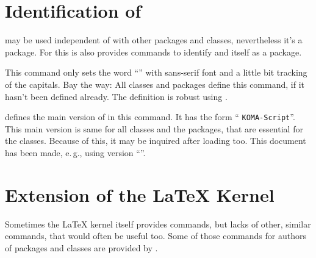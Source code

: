 \section{Identification of \KOMAScript}
\label{sec:scrbase.identify}

 may be used independent of \KOMAScript{} with
other packages and classes, nevertheless it's a \KOMAScript{} package. For
this is also provides commands to identify \KOMAScript{} and itself as a
\KOMAScript{} package.

\begin{Declaration}
\end{Declaration}
%
This command only sets the word ``\KOMAScript'' with sans-serif font and
a little bit tracking of the capitals. Bay the way: All \KOMAScript{} classes
and packages define this command, if it hasn't been defined already. The
definition is robust using .
%


\begin{Declaration}
\end{Declaration}
%
\KOMAScript{} defines the main version of \KOMAScript{} in this command. It
has the form ``  \texttt{KOMA-Script}''. This main
version is same for all \KOMAScript{} classes and the \KOMAScript{} packages,
that are essential for the classes. Because of this, it may be inquired after
loading  too. This document has been made, e.\,g., using
\KOMAScript{} version ``\KOMAScriptVersion''.
%
%


\section{Extension of the \LaTeX{} Kernel}
\label{sec:scrbase:latexkernel}

Sometimes the \LaTeX{} kernel itself provides commands, but lacks of other,
similar commands, that would often be useful too. Some of those commands for
authors of packages and classes are provided by .

